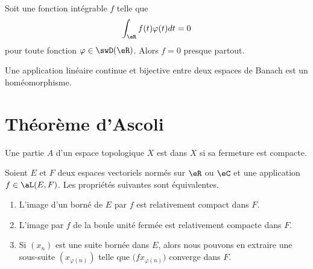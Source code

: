 
\begin{proposition} \label{PropAAjSURG}
    Soit une fonction intégrable \( f\) telle que
    \begin{equation}
        \int_{\eR}f(t)\varphi(t)dt=0
    \end{equation}
    pour toute fonction \( \varphi\in\swD(\eR)\). Alors \( f=0\) presque partout.
\end{proposition}

\begin{theorem}  \label{ThofQShsw}
    Une application linéaire continue et bijective entre deux espaces de Banach est un homéomorphisme.
\end{theorem}

\section{Théorème d'Ascoli}

\begin{definition}
    Une partie \( A\) d'un espace topologique \( X\) est  dans \( X\) si sa fermeture est compacte.
\end{definition}

\begin{proposition} \label{PropDGsPtpU}
    Soient \( E\) et \( F\) deux espaces vectoriels normés sur \( \eR\) ou \( \eC\) et une application \( f\in\aL(E,F)\). Les propriétés suivantes sont équivalentes.
    \begin{enumerate}
        \item
            L'image d'un borné de \( E\) par \( f\) est relativement compact dans \( F\).
        \item   \label{ItemJIkpUbLii}
            L'image par \( f\) de la boule unité fermée est relativement compacte dans \( F\).
        \item
            Si \( (x_n)\) est une suite bornée dans \( E\), alors nous pouvons en extraire une sous-suite \( (x_{\varphi(n)})\) telle que \( \big( fx_{\varphi(n)} \big)\) converge dans \( F\).
    \end{enumerate}
\end{proposition}

